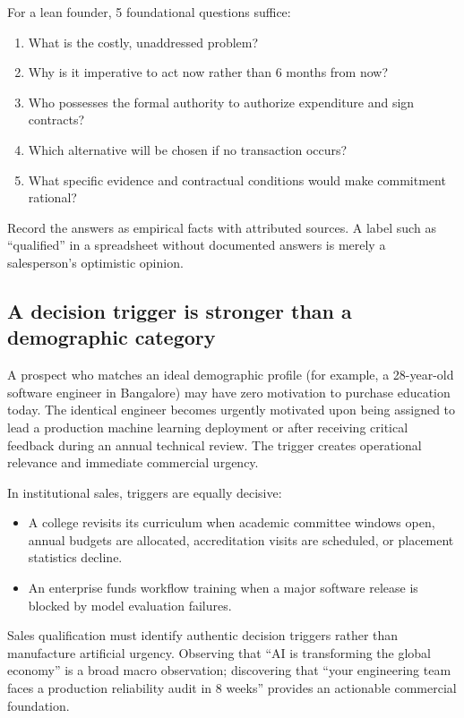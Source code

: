 For a lean founder, 5 foundational questions suffice:
\begin{enumerate}
\item What is the costly, unaddressed problem?
\item Why is it imperative to act now rather than 6 months from now?
\item Who possesses the formal authority to authorize expenditure and sign contracts?
\item Which alternative will be chosen if no transaction occurs?
\item What specific evidence and contractual conditions would make commitment rational?
\end{enumerate}
Record the answers as empirical facts with attributed sources. A label such as ``qualified'' in a spreadsheet without documented answers is merely a salesperson's optimistic opinion.

\subsection{A decision trigger is stronger than a demographic category}

A prospect who matches an ideal demographic profile (for example, a 28-year-old software engineer in Bangalore) may have zero motivation to purchase education today. The identical engineer becomes urgently motivated upon being assigned to lead a production machine learning deployment or after receiving critical feedback during an annual technical review. The trigger creates operational relevance and immediate commercial urgency.

In institutional sales, triggers are equally decisive:
\begin{itemize}
\item A college revisits its curriculum when academic committee windows open, annual budgets are allocated, accreditation visits are scheduled, or placement statistics decline.
\item An enterprise funds workflow training when a major software release is blocked by model evaluation failures.
\end{itemize}
Sales qualification must identify authentic decision triggers rather than manufacture artificial urgency. Observing that ``AI is transforming the global economy'' is a broad macro observation; discovering that ``your engineering team faces a production reliability audit in 8 weeks'' provides an actionable commercial foundation.

